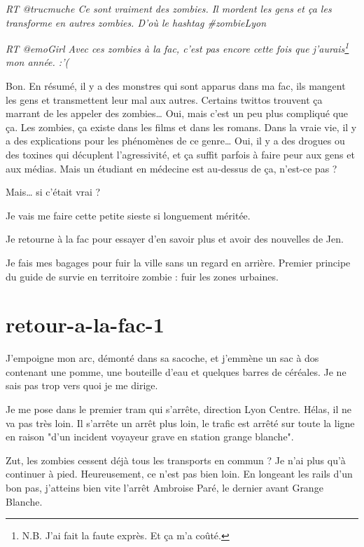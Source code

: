 \begin{center}
\textit{RT @trucmuche Ce sont vraiment des zombies. Il mordent les gens et ça les transforme en autres zombies. D'où le hashtag \#{}zombieLyon}
\end{center}

\begin{center}
\textit{RT @emoGirl Avec ces zombies à la fac, c'est pas encore cette fois que j'aurais\footnote{N.B. J'ai fait la faute exprès. Et ça m'a coûté.} mon année. :'(}
\end{center}

Bon. En résumé, il y a des monstres qui sont apparus dans ma fac, ils mangent les gens et transmettent leur mal aux autres. Certains twittos trouvent ça marrant de les appeler des zombies… Oui, mais c'est un peu plus compliqué que ça. Les zombies, ça existe dans les films et dans les romans. Dans la vraie vie, il y a des explications pour les phénomènes de ce genre… Oui, il y a des drogues ou des toxines qui décuplent l'agressivité, et ça suffit parfois à faire peur aux gens et aux médias. Mais un étudiant en médecine est au-dessus de ça, n'est-ce pas ?

Mais… si c'était vrai ?

\item Je vais me faire cette petite sieste si longuement méritée.
\item Je retourne à la fac pour essayer d'en savoir plus et avoir des nouvelles de Jen. 
\item Je fais mes bagages pour fuir la ville sans un regard en arrière. Premier principe du guide de survie en territoire zombie : fuir les zones urbaines. 
\enw

\section{retour-a-la-fac-1}

J'empoigne mon arc, démonté dans sa sacoche, et j'emmène un sac à dos contenant une pomme, une bouteille d'eau et quelques barres de céréales. Je ne sais pas trop vers quoi je me dirige.

Je me pose dans le premier tram qui s'arrête, direction Lyon Centre. Hélas, il ne va pas très loin. Il s'arrête un arrêt plus loin, le trafic est arrêté sur toute la ligne en raison "d'un incident voyayeur grave en station grange blanche".

Zut, les zombies cessent déjà tous les transports en commun ? Je n'ai plus qu'à continuer à pied. Heureusement, ce n'est pas bien loin. En longeant les rails d'un bon pas, j'atteins bien vite l'arrêt Ambroise Paré, le dernier avant Grange Blanche.

